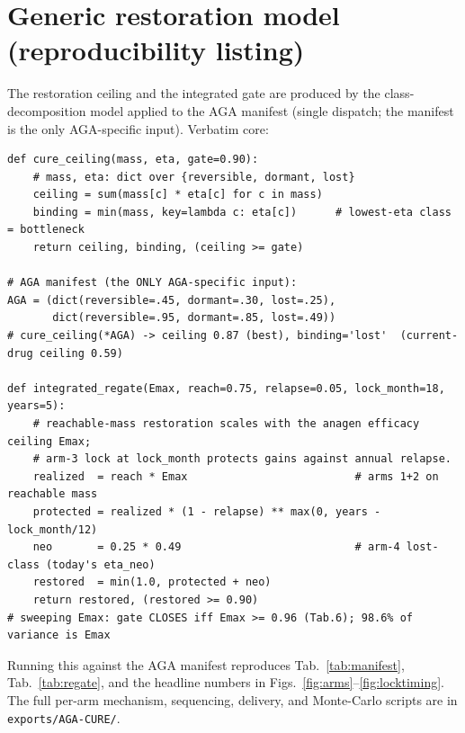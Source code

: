 \documentclass[11pt,a4paper]{article}
\begin{document}
\section{Generic restoration model (reproducibility listing)}
\label{app:code}
The restoration ceiling and the integrated gate are produced by the class-decomposition
model applied to the AGA manifest (single dispatch; the manifest is the only AGA-specific
input). Verbatim core:

\begin{lstlisting}[basicstyle=\ttfamily\footnotesize,frame=single,xleftmargin=0pt,breaklines=true]
def cure_ceiling(mass, eta, gate=0.90):
    # mass, eta: dict over {reversible, dormant, lost}
    ceiling = sum(mass[c] * eta[c] for c in mass)
    binding = min(mass, key=lambda c: eta[c])      # lowest-eta class = bottleneck
    return ceiling, binding, (ceiling >= gate)

# AGA manifest (the ONLY AGA-specific input):
AGA = (dict(reversible=.45, dormant=.30, lost=.25),
       dict(reversible=.95, dormant=.85, lost=.49))
# cure_ceiling(*AGA) -> ceiling 0.87 (best), binding='lost'  (current-drug ceiling 0.59)

def integrated_regate(Emax, reach=0.75, relapse=0.05, lock_month=18, years=5):
    # reachable-mass restoration scales with the anagen efficacy ceiling Emax;
    # arm-3 lock at lock_month protects gains against annual relapse.
    realized  = reach * Emax                          # arms 1+2 on reachable mass
    protected = realized * (1 - relapse) ** max(0, years - lock_month/12)
    neo       = 0.25 * 0.49                           # arm-4 lost-class (today's eta_neo)
    restored  = min(1.0, protected + neo)
    return restored, (restored >= 0.90)
# sweeping Emax: gate CLOSES iff Emax >= 0.96 (Tab.6); 98.6% of variance is Emax
\end{lstlisting}

\noindent Running this against the AGA manifest reproduces Tab.~\ref{tab:manifest},
Tab.~\ref{tab:regate}, and the headline numbers in Figs.~\ref{fig:arms}--\ref{fig:locktiming}.
The full per-arm mechanism, sequencing, delivery, and Monte-Carlo scripts are in
\texttt{exports/AGA-CURE/}.



\end{document}
